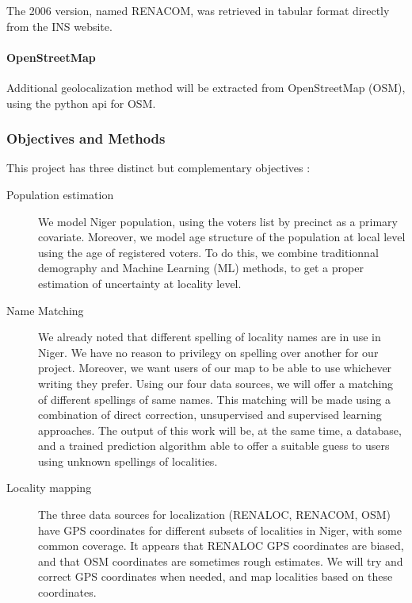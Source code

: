 The 2006 version, named RENACOM, was retrieved in tabular format directly from the INS website.

\paragraph{OpenStreetMap} Additional geolocalization method will be extracted from OpenStreetMap (OSM), using the python api for OSM.

\subsubsection{Objectives and Methods}

This project has three distinct but complementary objectives :
\begin{description}
	\item[Population estimation] We model Niger population, using the voters list by precinct as a primary covariate. Moreover, we model age structure of the population at local level using the age of registered voters. To do this, we combine traditionnal demography and Machine Learning (ML) methods, to get a proper estimation of uncertainty at locality level.
	\item[Name Matching] We already noted that different spelling of locality names are in use in Niger. We have no reason to privilegy on spelling over another for our project. Moreover, we want users of our map to be able to use whichever writing they prefer. Using our four data sources, we will offer a matching of different spellings of same names. This matching will be made using a combination of direct correction, unsupervised and supervised learning approaches. The output of this work will be, at the same time, a database, and a trained prediction algorithm able to offer a suitable guess to users using unknown spellings of localities.
	\item[Locality mapping] The three data sources for localization (RENALOC, RENACOM, OSM) have GPS coordinates for different subsets of localities in Niger, with some common coverage. It appears that RENALOC GPS coordinates are biased, and that OSM coordinates are sometimes rough estimates. We will try and correct GPS coordinates when needed, and map localities based on these coordinates.
\end{description}


